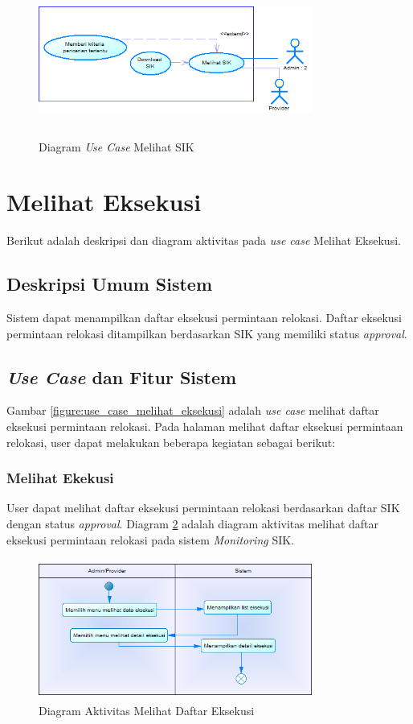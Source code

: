 	\begin{figure}[h]
	\centerline
	{\includegraphics[width=9cm,height=5cm]{bab4/use-case-melihat-sik.png}}
	\caption{Diagram \textit{Use Case} Melihat SIK}
	\label{figure:use_case_melihat_sik}
	\end{figure}
	
\section{Melihat Eksekusi}
Berikut adalah deskripsi dan diagram aktivitas pada \textit{use case} Melihat Eksekusi.
\subsection{Deskripsi Umum Sistem}
\tab Sistem dapat menampilkan daftar eksekusi permintaan relokasi. Daftar eksekusi permintaan relokasi ditampilkan berdasarkan SIK yang memiliki status \textit{approval}.
\subsection{\textit{Use Case} dan Fitur Sistem}
Gambar \ref{figure:use_case_melihat_eksekusi} adalah \textit{use case} melihat daftar eksekusi permintaan relokasi. Pada halaman melihat daftar eksekusi permintaan relokasi, user dapat melakukan beberapa kegiatan sebagai berikut:
	\subsubsection{Melihat Ekekusi}
	User dapat melihat daftar eksekusi permintaan relokasi berdasarkan daftar SIK dengan status \textit{approval}. Diagram \ref{figure:activity_melihat_eksekusi} adalah diagram aktivitas melihat daftar eksekusi permintaan relokasi pada sistem \textit{Monitoring} SIK.
	\begin{figure}[h]
	\centerline {\includegraphics[width=9cm,height=4.6cm]{bab4/ActivityDiagram_MelihatEksekusi.png}}
	\caption{Diagram Aktivitas Melihat Daftar Eksekusi}
	\label{figure:activity_melihat_eksekusi}
	\end{figure}
	
